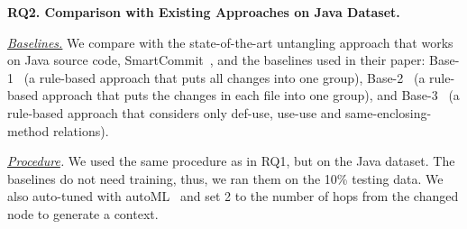 

\noindent\textbf{RQ2. Comparison with Existing Approaches on Java Dataset.}

{\em \underline{Baselines.}} We compare {\tool} with the
state-of-the-art untangling approach that works on Java source code,
SmartCommit~\cite{smartcommit-fse21}, and the baselines used in their
paper: Base-1~\cite{smartcommit-fse21} (a rule-based approach that
puts all changes into one group), Base-2~\cite{smartcommit-fse21} (a
rule-based approach that puts the changes in each file into one
group), and Base-3~\cite{smartcommit-fse21} (a rule-based approach
that considers only def-use, use-use and same-enclosing-method
relations).




\textit{ \underline{Procedure}.}
We used the same procedure as in RQ1, but on the Java dataset.  The
baselines do not need training, thus, we ran them on the 10\% testing
data. We also auto-tuned {\tool} with autoML~\cite{NNI} and set 2 to the number of hops from the changed node to generate a context. 

